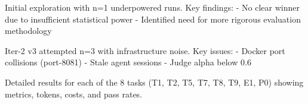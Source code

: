 

Initial exploration with n=1 underpowered runs. Key findings:
- No clear winner due to insufficient statistical power
- Identified need for more rigorous evaluation methodology


Iter-2 v3 attempted n=3 with infrastructure noise. Key issues:
- Docker port collisions (port-8081)
- Stale agent sessions
- Judge alpha below 0.6


Detailed results for each of the 8 tasks (T1, T2, T5, T7, T8, T9, E1, P0) showing metrics, tokens, costs, and pass rates.

